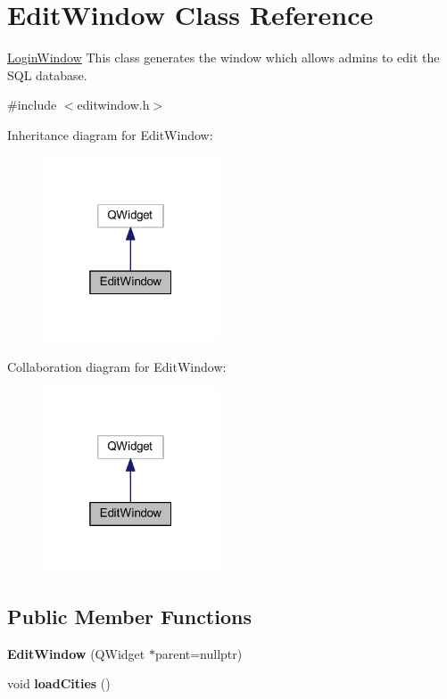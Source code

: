 \hypertarget{class_edit_window}{}\section{Edit\+Window Class Reference}
\label{class_edit_window}


\mbox{\hyperlink{class_login_window}{Login\+Window}} This class generates the window which allows admins to edit the S\+QL database.  




{\ttfamily \#include $<$editwindow.\+h$>$}



Inheritance diagram for Edit\+Window\+:
\nopagebreak
\begin{figure}[H]
\begin{center}
\leavevmode
\includegraphics[width=148pt]{class_edit_window__inherit__graph}
\end{center}
\end{figure}


Collaboration diagram for Edit\+Window\+:
\nopagebreak
\begin{figure}[H]
\begin{center}
\leavevmode
\includegraphics[width=148pt]{class_edit_window__coll__graph}
\end{center}
\end{figure}
\subsection*{Public Member Functions}
\begin{DoxyCompactItemize}
\item 
\mbox{\label{class_edit_window_a39a89944c117acac0419345f0a557528}} 
{\bfseries Edit\+Window} (Q\+Widget $\ast$parent=nullptr)
\item 
\mbox{\label{class_edit_window_a25f779fdb092f332adcbd2519df1c575}} 
void {\bfseries load\+Cities} ()
\end{DoxyCompactItemize}


